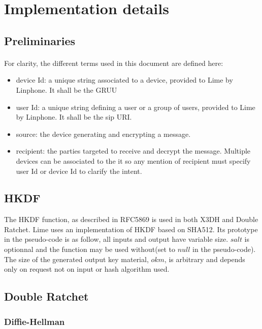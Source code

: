 \documentclass[a4paper,11pt]{article}
\begin{document}
\section{Implementation details}
  \subsection{Preliminaries}
    \paragraph{}For clarity, the different terms used in this document are defined here:
    \begin{itemize}
      \item device Id: a unique string associated to a device, provided to Lime by Linphone. It shall be the GRUU\cite{rfc5627}
      \item user Id: a unique string defining a user or a group of users, provided to Lime by Linphone. It shall be the sip URI.
      \item source: the device generating and encrypting a message.
      \item recipient: the parties targeted to receive and decrypt the message. Multiple devices can be associated to the it so any mention of recipient must specify user Id or device Id to clarify the intent.
    \end{itemize}

  \subsection{HKDF}
      The HKDF function, as described in RFC5869 \cite{rfc5869} is used in both X3DH and Double Ratchet. Lime uses an implementation of HKDF based on SHA512. Its prototype in the pseudo-code is as follow, all inputs and output have variable size. $salt$ is optionnal and the function may be used without(set to $null$ in the pseudo-code). The size of the generated output key material, $okm$, is arbitrary and depends only on request not on input or hash algorithm used.
      \begin{algorithmic}
        \Statex
          \State {}
        \EndFunction
      \end{algorithmic}
  \subsection{Double Ratchet}
    \subsubsection{Diffie-Hellman}
\end{document}
